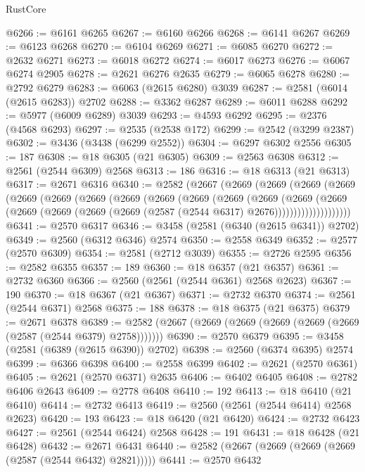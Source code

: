 \begin{lexlean}{RustCore}
\begin{coremodule}
@6266 := @6161 @6265
@6267 := @6160 @6266
@6268 := @6141 @6267
@6269 := @6123 @6268
@6270 := @6104 @6269
@6271 := @6085 @6270
@6272 := @2632 @6271
@6273 := @6018 @6272
@6274 := @6017 @6273
@6276 := @6067 @6274 @2905
@6278 := @2621 @6276 @2635
@6279 := @6065 @6278
@6280 := @2792 @6279
@6283 := @6063 (@2615 @6280) @3039
@6287 := @2581 (@6014 (@2615 @6283)) @2702
@6288 := @3362 @6287
@6289 := @6011 @6288
@6292 := @5977 (@6009 @6289) @3039
@6293 := @4593 @6292
@6295 := @2376 (@4568 @6293)
@6297 := @2535 (@2538 @172)
@6299 := @2542 (@3299 @2387)
@6302 := @3436 (@3438 (@6299 @2552))
@6304 := @6297 @6302 @2556
@6305 := 187
@6308 := @18 @6305 (@21 @6305)
@6309 := @2563 @6308
@6312 := @2561 (@2544 @6309) @2568
@6313 := 186
@6316 := @18 @6313 (@21 @6313)
@6317 := @2671 @6316
@6340 := @2582
    (@2667
      (@2669
        (@2669
          (@2669
            (@2669
              (@2669
                (@2669
                  (@2669
                    (@2669
                      (@2669
                        (@2669
                          (@2669
                            (@2669
                              (@2669
                                (@2669
                                  (@2669
                                    (@2669
                                      (@2669 (@2669 (@2587 (@2544 @6317) @2676))))))))))))))))))))
@6341 := @2570 @6317
@6346 := @3458 (@2581 (@6340 (@2615 @6341)) @2702)
@6349 := @2560 (@6312 @6346) @2574
@6350 := @2558 @6349
@6352 := @2577 (@2570 @6309)
@6354 := @2581 (@2712 @3039)
@6355 := @2726 @2595
@6356 := @2582 @6355
@6357 := 189
@6360 := @18 @6357 (@21 @6357)
@6361 := @2732 @6360
@6366 := @2560 (@2561 (@2544 @6361) @2568 @2623)
@6367 := 190
@6370 := @18 @6367 (@21 @6367)
@6371 := @2732 @6370
@6374 := @2561 (@2544 @6371) @2568
@6375 := 188
@6378 := @18 @6375 (@21 @6375)
@6379 := @2671 @6378
@6389 := @2582 (@2667 (@2669 (@2669 (@2669 (@2669 (@2669 (@2587 (@2544 @6379) @2758)))))))
@6390 := @2570 @6379
@6395 := @3458 (@2581 (@6389 (@2615 @6390)) @2702)
@6398 := @2560 (@6374 @6395) @2574
@6399 := @6366 @6398
@6400 := @2558 @6399
@6402 := @2621 (@2570 @6361)
@6405 := @2621 (@2570 @6371) @2635
@6406 := @6402 @6405
@6408 := @2782 @6406 @2643
@6409 := @2778 @6408
@6410 := 192
@6413 := @18 @6410 (@21 @6410)
@6414 := @2732 @6413
@6419 := @2560 (@2561 (@2544 @6414) @2568 @2623)
@6420 := 193
@6423 := @18 @6420 (@21 @6420)
@6424 := @2732 @6423
@6427 := @2561 (@2544 @6424) @2568
@6428 := 191
@6431 := @18 @6428 (@21 @6428)
@6432 := @2671 @6431
@6440 := @2582 (@2667 (@2669 (@2669 (@2669 (@2587 (@2544 @6432) @2821)))))
@6441 := @2570 @6432

\end{coremodule}
\end{lexlean}

